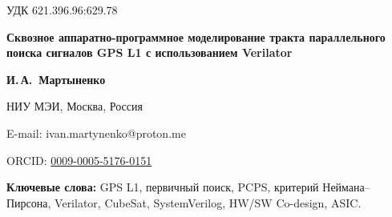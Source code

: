\noindent УДК 621.396.96:629.78

\vspace{1em}

\begin{center}
    {\bfseries\large Сквозное аппаратно-программное моделирование тракта параллельного поиска сигналов GPS L1 с использованием Verilator\par}
    \vspace{1em}
    {\bfseries И.\,А.~Мартыненко}\par
    {\small НИУ МЭИ, Москва, Россия\par}
    {\small E-mail: ivan.martynenko@proton.me\par}
    {\small ORCID: \href{https://orcid.org/0009-0005-5176-0151}{0009-0005-5176-0151}\par}
\end{center}

\vspace{1em}
\begin{abstract}
Разработка бортовых навигационных приемников для малых космических аппаратов (МКА) формата CubeSat требует применения алгоритмов параллельного поиска (PCPS) для преодоления высокой динамики доплеровского сдвига. Однако традиционное событийно-управляемое моделирование таких трактов сталкивается с вычислительным барьером при обработке длинных выборок сигнала. В данной работе предложена методология сквозной верификации тракта первичного поиска GPS L1, объединяющая синтезируемую RTL-модель на SystemVerilog и программное окружение на C++ в единый исполняемый файл с помощью компилятора Verilator. Использование статического планирования графа схемы и нативной интеграции C++ позволило реализовать адаптивный детектор Неймана–Пирсона с оценкой шума по выборке без накладных расходов на межъязыковое взаимодействие. Экспериментальные результаты на модели сигнала с отношением сигнал/шум –25 дБ подтвердили работоспособность комплекса: полное сканирование пространства «задержка–Доплер» в диапазоне ±50 кГц (201 частотный срез) выполнено за один прогон симуляции
\end{abstract}

\noindent \textbf{Ключевые слова:} GPS L1, первичный поиск, PCPS, критерий Неймана--Пирсона, Verilator, CubeSat, SystemVerilog, HW/SW Co-design, ASIC.

\vspace{1.5em}
\vspace{1.5em}
